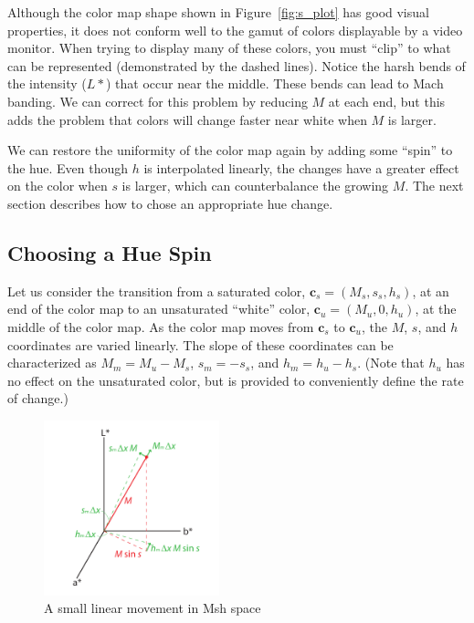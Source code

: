\documentclass{acmsiggraph}               %
\newcommand{\Msh}{Msh\xspace}
\newcommand*{\cvec}[1]{\mathbf{#1}}
\begin{document}
Although the color map shape shown in Figure~\ref{fig:s_plot} has good
visual properties, it does not conform well to the gamut of colors
displayable by a video monitor.  When trying to display many of these
colors, you must ``clip'' to what can be represented (demonstrated by the
dashed lines).  Notice the harsh bends of the intensity ($L*$) that occur
near the middle.  These bends can lead to Mach banding.  We can correct for
this problem by reducing $M$ at each end, but this adds the problem that
colors will change faster near white when $M$ is larger.

We can restore the uniformity of the color map again by adding some
``spin'' to the hue.  Even though $h$ is interpolated linearly, the changes
have a greater effect on the color when $s$ is larger, which can
counterbalance the growing $M$.  The next section describes how to chose an
appropriate hue change.

\subsection{Choosing a Hue Spin}
\label{sec:ChoosingAHueSpin}

Let us consider the transition from a saturated color, $\cvec{c}_s=(M_s,
s_s, h_s)$, at an end of the color map to an unsaturated ``white'' color,
$\cvec{c}_u=(M_u, 0, h_u)$, at the middle of the color map.  As the
color map moves from $\cvec{c}_s$ to $\cvec{c}_u$, the $M$, $s$, and $h$
coordinates are varied linearly.  The slope of these coordinates can be
characterized as $M_m = M_u - M_s$, $s_m = -s_s$, and $h_m = h_u - h_s$.
(Note that $h_u$ has no effect on the unsaturated color, but is provided to
conveniently define the rate of change.)

\begin{figure}
  \centering
  \includegraphics[height=2in]{images/MshDeltaMovements}
  \caption{A small linear movement in \Msh space}
  \label{sec:LinearMshMovement}
\end{figure}
\end{document}
